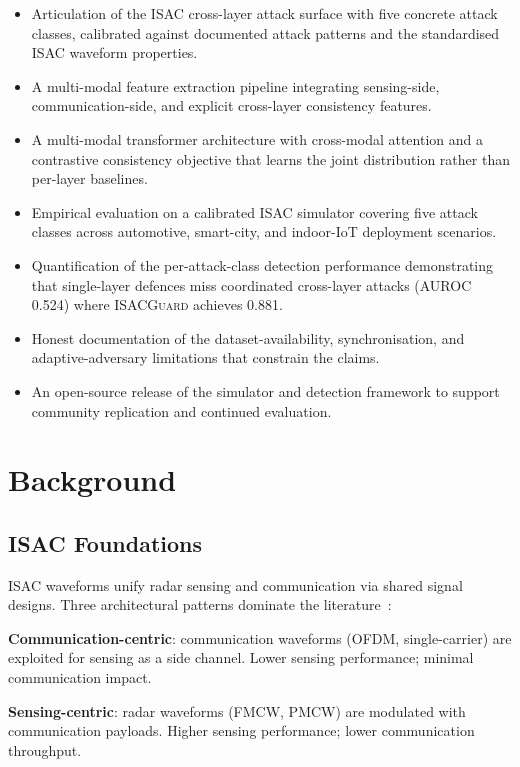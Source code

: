 \documentclass[sigconf,nonacm]{acmart}
\begin{document}
\begin{itemize}
  \item Articulation of the ISAC cross-layer attack surface with
        five concrete attack classes, calibrated against documented
        attack patterns and the standardised ISAC waveform
        properties.
  \item A multi-modal feature extraction pipeline integrating
        sensing-side, communication-side, and explicit cross-layer
        consistency features.
  \item A multi-modal transformer architecture with cross-modal
        attention and a contrastive consistency objective that
        learns the joint distribution rather than per-layer
        baselines.
  \item Empirical evaluation on a calibrated ISAC simulator
        covering five attack classes across automotive,
        smart-city, and indoor-IoT deployment scenarios.
  \item Quantification of the per-attack-class detection
        performance demonstrating that single-layer defences miss
        coordinated cross-layer attacks (AUROC 0.524) where
        \textsc{ISACGuard} achieves 0.881.
  \item Honest documentation of the dataset-availability,
        synchronisation, and adaptive-adversary limitations that
        constrain the claims.
  \item An open-source release of the simulator and detection
        framework to support community replication and continued
        evaluation.
\end{itemize}

\section{Background}

\subsection{ISAC Foundations}

ISAC waveforms unify radar sensing and communication via shared
signal designs. Three architectural patterns dominate the
literature~\cite{liu2024isac,zhang2024isacwaveform}:

\textbf{Communication-centric}: communication waveforms (OFDM,
single-carrier) are exploited for sensing as a side channel.
Lower sensing performance; minimal communication impact.

\textbf{Sensing-centric}: radar waveforms (FMCW, PMCW) are
modulated with communication payloads. Higher sensing
performance; lower communication throughput.
\end{document}
